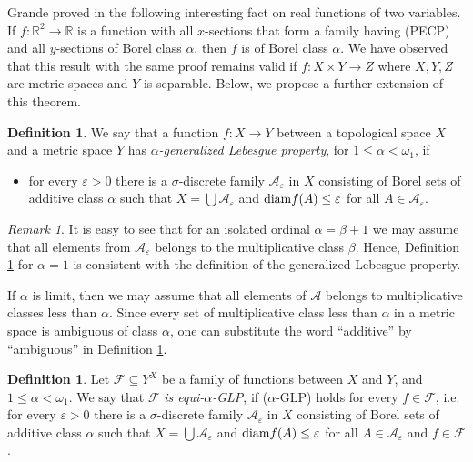 \documentclass[a4paper]{amsart}
\theoremstyle{plain}
\theoremstyle{definition}
\newtheorem{definition}[theorem]{Definition}
\theoremstyle{remark}
\newtheorem{remark}[theorem]{Remark}
\numberwithin{equation}{section}
\newcommand{\R}{\mathbb R}
\begin{document}
Grande proved in \cite[Thm 6]{Gr} the following interesting fact on real functions of two variables.
If $f\colon\R^2\to\R$ is a function with all $x$-sections that form a family having (PECP) and all $y$-sections of Borel class 
$\alpha$, then $f$ is of Borel class $\alpha$. We have observed that this result with the same proof remains valid if $f\colon X\times Y\to Z$ where $X,Y,Z$ are metric spaces and $Y$ is separable.
Below, we propose a further extension of this theorem.


\begin{definition}\label{alphaGLP1}
		We say that a function $f\colon X\to Y$ between a topological space $X$ and a metric space $Y$ has  \emph{$\alpha$-generalized Lebesgue property}, for $1\le \alpha<\omega_1$, if 
			\begin{itemize}
				\item[{\rm ($\alpha$-GLP)}] for every $\varepsilon >0$ there is a $\sigma$-discrete family $\mathcal A_\varepsilon$ in $X$ consisting of Borel sets of additive class $\alpha$  such that $X=\bigcup \mathcal A_\varepsilon$ and ${\rm diam}f(A)\le\varepsilon$ for all $A\in\mathcal A_\varepsilon$.
			\end{itemize}
	\end{definition}
	
	\begin{remark}
		It is easy to see that for an isolated ordinal $\alpha=\beta+1$ we may assume that all elements from $\mathcal A_\varepsilon$ belongs to the multiplicative class $\beta$. Hence, Definition \ref{alphaGLP1} for $\alpha=1$ is consistent with the definition of the generalized Lebesgue property. 
		
		If $\alpha$ is limit, then we may assume that all elements of $\mathcal A$ belongs to multiplicative classes less than $\alpha$. Since every set of multiplicative class less than $\alpha$ in a metric space is ambiguous of class $\alpha$, one can substitute the word ``additive'' by ``ambiguous'' in Definition \ref{alphaGLP1}.
	\end{remark}
	

	
\begin{definition}
	Let $\mathscr F\subseteq Y^X$ be a family of functions between $X$ and $Y$, and $1\le\alpha<\omega_1$. We say that $\mathscr F$ {\it is equi-$\alpha$-GLP}, if ($\alpha$-GLP) holds for every $f\in\mathcal F$, i.e.
    for every $\varepsilon >0$ there is a $\sigma$-discrete family $\mathcal A_\varepsilon$ in $X$ consisting of Borel sets of additive class $\alpha$  such that $X=\bigcup \mathcal A_\varepsilon$ and ${\rm diam}f(A)\le\varepsilon$ for all $A\in\mathcal A_\varepsilon$ and $f\in\mathcal{F}$.
\end{definition}
\end{document}
